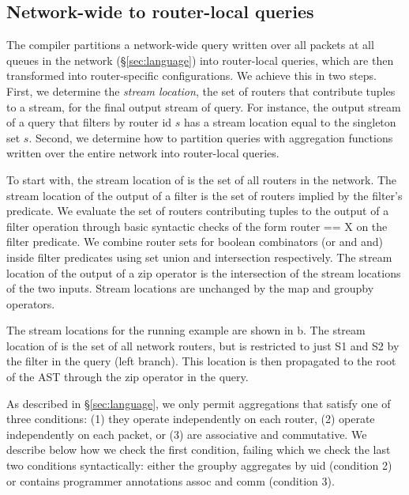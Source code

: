 \subsection{Network-wide to router-local queries}
\label{sec:network-to-router-local}

The compiler partitions a network-wide query written over all packets at all
queues in the network (\S\ref{sec:language}) into router-local queries, which
are then transformed into router-specific configurations. We achieve this in
two steps. First, we determine the {\em stream location}, \ie the set of
routers that contribute tuples to a stream, for the final output stream of
query. For instance, the output stream of a query that filters by router id $s$
has a stream location equal to the singleton set $s$. Second, we determine how
to partition queries with aggregation functions written over the entire network
into router-local queries.

 To start with,
the stream location of {\ct \pktlog} is the set of all routers in the network.
The stream location of the output of a {\ct filter} is the set of routers
implied by the filter's predicate. We evaluate the set of routers contributing
tuples to the output of a {\ct filter} operation through basic syntactic checks
of the form {\ct router == X} on the {\ct filter} predicate.  We combine router
sets for boolean combinators ({\ct or} and {\ct and}) inside filter predicates
using set union and intersection respectively.  The stream location of the
output of a {\ct zip} operator is the intersection of the stream locations of
the two inputs.  Stream locations are unchanged by the {\ct map} and {\ct
groupby} operators.

The stream locations for the running example are shown in
b. The stream location of {\ct \pktlog} is the
set of all network routers, but is restricted to just {\ct S1} and {\ct S2} by
the {\ct filter} in the query (left branch). This location is then propagated
to the root of the AST through the {\ct zip} operator in the query.

As described in \S\ref{sec:language}, we only permit aggregations that satisfy
one of three conditions: (1) they operate independently on each router, (2)
operate independently on each packet, or (3) are associative and commutative.
We describe below how we check the first condition, failing which we check the
last two conditions syntactically: either the {\ct groupby} aggregates by {\ct
uid} (condition 2) or contains programmer annotations {\ct assoc} and {\ct
comm} (condition 3).

